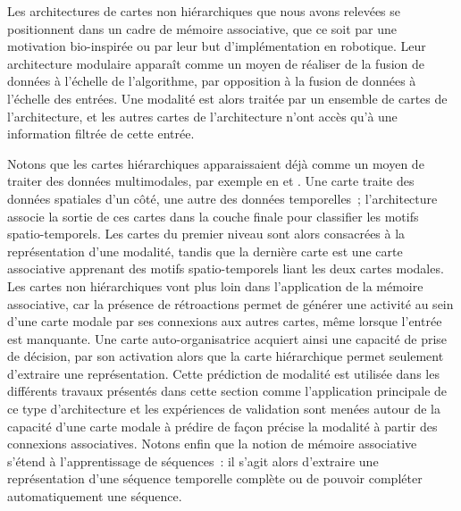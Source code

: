 \documentclass[../main]{subfiles}
\begin{document}
Les architectures de cartes non hiérarchiques que nous avons relevées se positionnent dans un cadre de mémoire associative, que ce soit par une motivation bio-inspirée ou par leur but d'implémentation en robotique.
Leur architecture modulaire apparaît comme un moyen de réaliser de la fusion de données à l'échelle de l'algorithme, par opposition à la fusion de données à l'échelle des entrées. 
Une modalité est alors traitée par un ensemble de cartes de l'architecture, et les autres cartes de l'architecture n'ont accès qu'à une information filtrée de cette entrée. 


Notons que les cartes hiérarchiques apparaissaient déjà comme un moyen de traiter des données multimodales, par exemple en \cite{mici_self-organizing_2018} et \cite{nawaratne_hierarchical_2020-1}. 
Une carte traite des données spatiales d'un côté, une autre des données temporelles~; l'architecture associe la sortie de ces cartes dans la couche finale pour classifier les motifs spatio-temporels. Les cartes du premier niveau sont alors consacrées à la représentation d'une modalité, tandis que la dernière carte est une carte associative apprenant des motifs spatio-temporels liant les deux cartes modales.
Les cartes non hiérarchiques vont plus loin dans l'application de la mémoire associative, car la présence de rétroactions permet de générer une activité au sein d'une carte modale par ses connexions aux autres cartes, même lorsque l'entrée est manquante. Une carte auto-organisatrice acquiert ainsi une capacité de prise de décision, par son activation alors que la carte hiérarchique permet seulement d'extraire une représentation.
Cette prédiction de modalité est utilisée dans les différents travaux présentés dans cette section comme l'application principale de ce type d'architecture et les expériences de validation sont menées autour de la capacité d'une carte modale à prédire de façon précise la modalité à partir des connexions associatives.
Notons enfin que la notion de mémoire associative s'étend à l'apprentissage de séquences~: il s'agit alors d'extraire une représentation d'une séquence temporelle complète ou de pouvoir compléter automatiquement une séquence.
\end{document}
